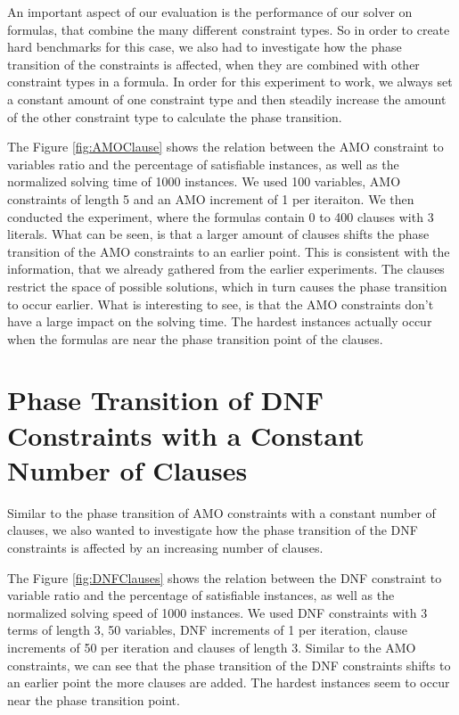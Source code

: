 An important aspect of our evaluation is the performance of our solver on formulas, that combine the many different constraint types. So in order to create hard benchmarks for this case, we also had to investigate how the phase transition of the constraints is affected, when they are combined with other constraint types in a formula. In order for this experiment to work, we always set a constant amount of one constraint type and then steadily increase the amount of the other constraint type to calculate the phase transition.

	

The Figure \ref{fig:AMOClause} shows the relation between the AMO constraint to variables ratio and the percentage of satisfiable instances, as well as the normalized solving time of 1000 instances. We used 100 variables, AMO constraints of length 5 and an AMO increment of 1 per iteraiton. We then conducted the experiment, where the formulas contain 0 to 400 clauses with 3 literals. What can be seen, is that a larger amount of clauses shifts the phase transition of the AMO constraints to an earlier point. This is consistent with the information, that we already gathered from the earlier experiments. The clauses restrict the space of possible solutions, which in turn causes the phase transition to occur earlier. What is interesting to see, is that the AMO constraints don't have a large impact on the solving time. The hardest instances actually occur when the formulas are near the phase transition point of the clauses.

\section{Phase Transition of DNF Constraints with a Constant Number of Clauses}

Similar to the phase transition of AMO constraints with a constant number of clauses, we also wanted to investigate how the phase transition of the DNF constraints is affected by an increasing number of clauses.

	

The Figure \ref{fig:DNFClauses} shows the relation between the DNF constraint to variable ratio and the percentage of satisfiable instances, as well as the normalized solving speed of 1000 instances. We used DNF constraints with 3 terms of length 3, 50 variables, DNF increments of 1 per iteration, clause increments of 50 per iteration and clauses of length 3. Similar to the AMO constraints, we can see that the phase transition of the DNF constraints shifts to an earlier point the more clauses are added. The hardest instances seem to occur near the phase transition point.

